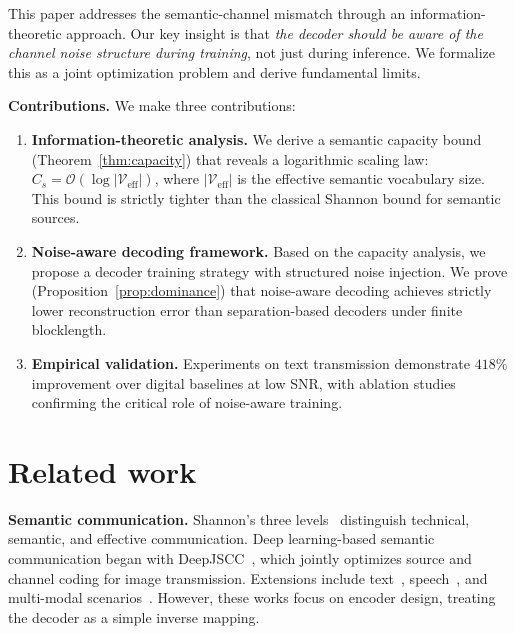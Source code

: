 \documentclass[a4paper,fleqn]{cas-sc}
\begin{document}
This paper addresses the semantic-channel mismatch through an information-theoretic approach. Our key insight is that \emph{the decoder should be aware of the channel noise structure during training}, not just during inference. We formalize this as a joint optimization problem and derive fundamental limits.

\textbf{Contributions.} We make three contributions:

\begin{enumerate}
\item \textbf{Information-theoretic analysis.} We derive a semantic capacity bound (Theorem~\ref{thm:capacity}) that reveals a logarithmic scaling law: $C_s = \mathcal{O}(\log |\mathcal{V}_{\text{eff}}|)$, where $|\mathcal{V}_{\text{eff}}|$ is the effective semantic vocabulary size. This bound is strictly tighter than the classical Shannon bound for semantic sources.

\item \textbf{Noise-aware decoding framework.} Based on the capacity analysis, we propose a decoder training strategy with structured noise injection. We prove (Proposition~\ref{prop:dominance}) that noise-aware decoding achieves strictly lower reconstruction error than separation-based decoders under finite blocklength.

\item \textbf{Empirical validation.} Experiments on text transmission demonstrate $418\%$ improvement over digital baselines at low SNR, with ablation studies confirming the critical role of noise-aware training.
\end{enumerate}


\section{Related work}\label{sec:related}

\textbf{Semantic communication.} Shannon's three levels~\citep{shannon1948mathematical} distinguish technical, semantic, and effective communication. Deep learning-based semantic communication began with DeepJSCC~\citep{kurka2020deepjssc}, which jointly optimizes source and channel coding for image transmission. Extensions include text~\citep{qin2023semantic}, speech~\citep{tung2021semantic}, and multi-modal scenarios~\citep{zhang2023crossmodal}. However, these works focus on encoder design, treating the decoder as a simple inverse mapping.
\end{document}

